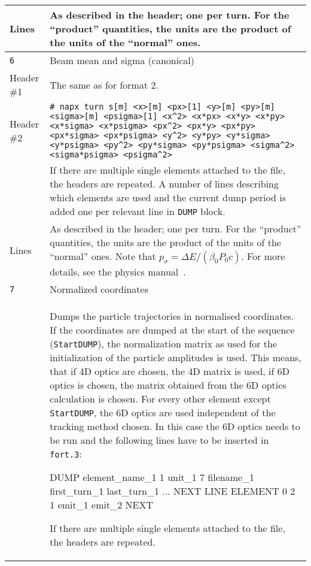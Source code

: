 \begin{center}
\begin{longtable}{|p{1.8cm}|p{13.8cm}|}
        \hline
        Lines      & As described in the header; one per turn. For the ``product'' quantities, the units are the product of the units of the ``normal'' ones. \\
        \hline
        \rowcolor{blue!15}
        \texttt{6} & Beam mean and sigma (canonical) \\
        \hline
        Header \#1 & The same as for format 2.\\
        \hline
        Header \#2 & \texttt{\# napx turn s[m] <x>[m] <px>[1] <y>[m] <py>[m] <sigma>[m] <psigma>[1] <x\^{}2> <x*px> <x*y> <x*py> <x*sigma> <x*psigma> <px\^{}2> <px*y> <px*py> <px*sigma> <px*psigma> <y\^{}2> <y*py> <y*sigma> <y*psigma> <py\^{}2> <py*sigma> <py*psigma> <sigma\^{}2> <sigma*psigma> <psigma\^{}2>}\vspace{1mm}\\
                   & If there are multiple single elements attached to the file, the headers are repeated. A number of lines describing which elements are used and the current dump period is added one per relevant line in \texttt{DUMP} block.\\
        \hline
        Lines      & As described in the header; one per turn. For the ``product'' quantities, the units are the product of the units of the ``normal'' ones. Note that $p_\sigma = \Delta E / \left(\beta_0 P_0 c\right)$. For more details, see the physics manual~\cite{sixphys}. \\
        \hline
        \rowcolor{blue!15}
        \texttt{7} & Normalized coordinates\\
        \hline
        & Dumps the particle trajectories in normalised coordinates. If the coordinates are dumped at the start of the sequence (\texttt{StartDUMP}), the normalization matrix as used for the initialization of the particle amplitudes is used. This means, that if 4D optics are chosen, the 4D matrix is used, if 6D optics is chosen, the matrix obtained from the 6D optics calculation is chosen. For every other element except \texttt{StartDUMP}, the 6D optics are used independent of the tracking method chosen. In this case the 6D optics needs to be run and the following lines have to be inserted in \texttt{fort.3}:
        \bigskip
        \begin{cverbatim}
DUMP
element_name_1 1 unit_1 7 filename_1 first_turn_1 last_turn_1
...
NEXT
LINE
ELEMENT  0 2 1 emit_1 emit_2
NEXT
        \end{cverbatim}
        \bigskip
        If there are multiple single elements attached to the file, the headers are repeated.\\

\end{longtable}
\end{center}
